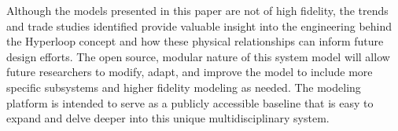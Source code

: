 Although the models presented in this paper are not of high
fidelity, the trends and trade studies identified provide valuable insight
into the engineering behind the Hyperloop concept and how these physical
relationships can inform future design efforts. The open source, modular
nature of this system model will allow future researchers to modify, adapt,
and improve the model to include more specific subsystems and higher fidelity
modeling as needed. The modeling platform is intended to serve as a publicly
accessible baseline that is easy to expand and delve deeper into this unique
multidisciplinary system.